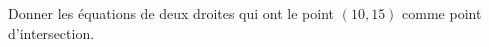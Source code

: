 
\begin{exercice}\label{exosmath-0451}

Donner les équations de deux droites qui ont le point \( (10,15)\) comme point d'intersection.

\end{exercice}
